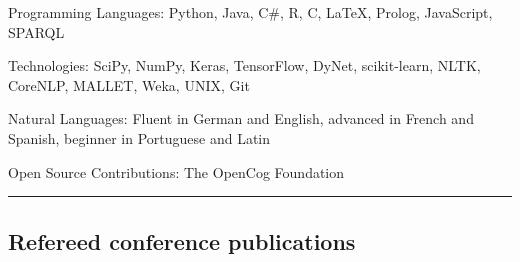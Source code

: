 \documentclass[10pt,letterpaper]{article}
\makeatletter
\newenvironment{indentsection}[1]%
{\begin{list}{}%
	{\setlength{\leftmargin}{#1}}%
	\item[]%
}
{\end{list}}
\newcommand{\headerrow}[2]
{\begin{tabular*}{\linewidth}{l@{\extracolsep{\fill}}r}
	#1 &
	#2 \\
\end{tabular*}}
\makeatother
\begin{document}
\begin{indentsection}{\parindent}
\begin{description*}
	\item[Programming Languages:]
	Python, Java, C\#, R, C, \LaTeX, Prolog, JavaScript, SPARQL
	\item[Technologies:]
	SciPy, NumPy, Keras, TensorFlow, DyNet, scikit-learn, NLTK, CoreNLP, MALLET, Weka, UNIX, Git
	\item[Natural Languages:]
	Fluent in German and English, advanced in French and Spanish, beginner in Portuguese and Latin	
	\item[Open Source Contributions:]
	The OpenCog Foundation
\end{description*}
\end{indentsection}

%
%

\hrule
\vspace{-0.4em}
\subsection*{Refereed conference publications}
\end{document}
